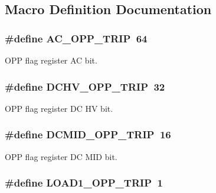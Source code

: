 \subsection{Macro Definition Documentation}
\hypertarget{a00032_adf494b474f7ddb554f7d6095fa5bf387}{
\subsubsection[{A\-C\-\_\-\-O\-P\-P\-\_\-\-T\-R\-I\-P}]{\setlength{\rightskip}{0pt plus 5cm}\#define A\-C\-\_\-\-O\-P\-P\-\_\-\-T\-R\-I\-P~64}}\label{a00032_adf494b474f7ddb554f7d6095fa5bf387}
O\-P\-P flag register A\-C bit. \hypertarget{a00032_af157ad216f4a380ac6db0b81cb384e4a}{
\subsubsection[{D\-C\-H\-V\-\_\-\-O\-P\-P\-\_\-\-T\-R\-I\-P}]{\setlength{\rightskip}{0pt plus 5cm}\#define D\-C\-H\-V\-\_\-\-O\-P\-P\-\_\-\-T\-R\-I\-P~32}}\label{a00032_af157ad216f4a380ac6db0b81cb384e4a}
O\-P\-P flag register D\-C H\-V bit. \hypertarget{a00032_ac02d3bbcf9e07f26248ae2f667713770}{
\subsubsection[{D\-C\-M\-I\-D\-\_\-\-O\-P\-P\-\_\-\-T\-R\-I\-P}]{\setlength{\rightskip}{0pt plus 5cm}\#define D\-C\-M\-I\-D\-\_\-\-O\-P\-P\-\_\-\-T\-R\-I\-P~16}}\label{a00032_ac02d3bbcf9e07f26248ae2f667713770}
O\-P\-P flag register D\-C M\-I\-D bit. \hypertarget{a00032_afe8a1619d93171d3cc6de1547cb65982}{
\subsubsection[{L\-O\-A\-D1\-\_\-\-O\-P\-P\-\_\-\-T\-R\-I\-P}]{\setlength{\rightskip}{0pt plus 5cm}\#define L\-O\-A\-D1\-\_\-\-O\-P\-P\-\_\-\-T\-R\-I\-P~1}}\label{a00032_afe8a1619d93171d3cc6de1547cb65982}

